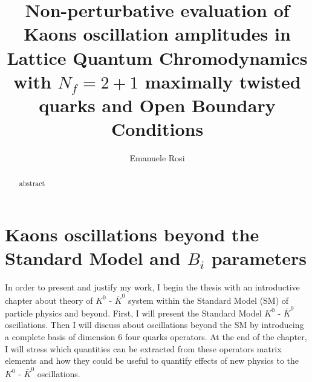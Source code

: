 \documentclass[english, LaM, oneside, noexaminfo]{sapthesis}
\title{Non-perturbative evaluation of Kaons oscillation amplitudes in Lattice Quantum Chromodynamics with $N_f = 2+1$ maximally twisted quarks and Open Boundary Conditions}
\author{Emanuele Rosi}
\newcommand{\kkb}{$K^0$ - $\bar K^0$ }
\begin{document}
\frontmatter
\maketitle

\dedication{
    dedication
}

\begin{abstract}
    abstract
\end{abstract}

\tableofcontents

\mainmatter

\chapter{Kaons oscillations beyond the Standard Model and $B_i$ parameters}\label{chap:kaons}
\lettrine[lines=2, findent=3pt, nindent=0pt]{I}{}n order to present and justify my work, I begin the thesis with an introductive chapter about theory of \kkb system within the Standard Model (SM) of particle physics and beyond. 
First, I will present the Standard Model \kkb oscillations.
Then I will discuss about oscillations beyond the SM by introducing a complete basis of dimension 6 four quarks operators.
At the end of the chapter, I will stress which quantities can be extracted from these operators matrix elements and how they could be useful to quantify effects of new physics to the \kkb oscillations.
\end{document}
